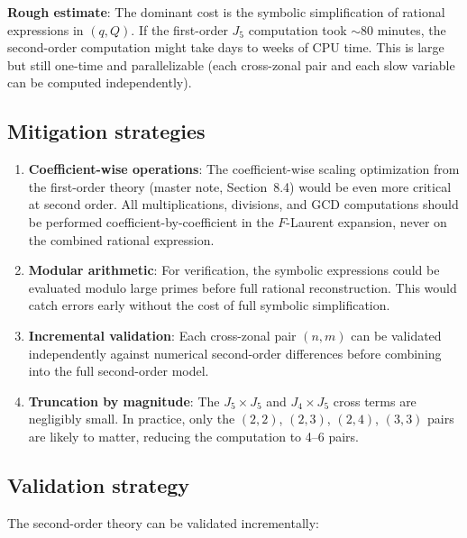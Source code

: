 \documentclass[11pt]{article}
\begin{document}
\textbf{Rough estimate}: The dominant cost is the symbolic simplification of
rational expressions in $(q, Q)$. If the first-order $J_5$ computation took
$\sim$80 minutes, the second-order computation might take days to weeks of
CPU time. This is large but still one-time and parallelizable (each
cross-zonal pair and each slow variable can be computed independently).

\subsection{Mitigation strategies}

\begin{enumerate}
\item \textbf{Coefficient-wise operations}: The coefficient-wise scaling
optimization from the first-order theory (master note, Section~8.4) would be
even more critical at second order. All multiplications, divisions, and GCD
computations should be performed coefficient-by-coefficient in the $F$-Laurent
expansion, never on the combined rational expression.

\item \textbf{Modular arithmetic}: For verification, the symbolic expressions
could be evaluated modulo large primes before full rational reconstruction.
This would catch errors early without the cost of full symbolic
simplification.

\item \textbf{Incremental validation}: Each cross-zonal pair $(n, m)$ can be
validated independently against numerical second-order differences before
combining into the full second-order model.

\item \textbf{Truncation by magnitude}: The $J_5 \times J_5$ and
$J_4 \times J_5$ cross terms are negligibly small. In practice, only the
$(2,2)$, $(2,3)$, $(2,4)$, $(3,3)$ pairs are likely to matter, reducing the
computation to 4--6 pairs.
\end{enumerate}

\subsection{Validation strategy}

The second-order theory can be validated incrementally:
\end{document}
